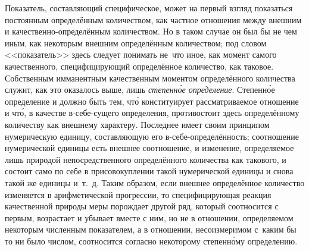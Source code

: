 Показатель, составляющий специфическое, может на первый взгляд показаться
постоянным определённым количеством, как частное отношения между внешним и
качественно-определённым количеством. Но в таком случае он был бы не чем иным,
как некоторым внешним определённым количеством; под словом <<показатель>> здесь
следует понимать не~что иное, как момент самого качественного, специфицирующий
определённое количество, как таковое. Собственным имманентным качественным
моментом определённого количества служит, как это оказалось выше, лишь
{\em степенн\'{о}е определение}. Степенн\'{о}е определение и должно быть тем,
чт\'{о} конституирует рассматриваемое отношение и чт\'{о}, в качестве
в-себе-сущего определения, противостоит здесь определённому количеству как
внешнему характеру. Последнее имеет своим принципом нумерическую единицу,
составляющую его в-себе-определённость; соотношение нумерической единицы есть
внешнее соотношение, и изменение, определяемое лишь природой непосредственного
определённого количества как такового, и состоит само по себе в присовокуплении
такой нумерической единицы и снова такой же единицы и~т.~д. Таким образом, если
внешнее определённое количество изменяется в арифметической прогрессии, то
специфицирующая реакция качественной природы меры порождает другой ряд, который
соотносится с первым, возрастает и убывает вместе с ним, но не в отношении,
определяемом некоторым численным показателем, а в отношении, несоизмеримом
с~каким бы то ни было числом, соотносится согласно некоторому степенн\'{о}му
определению.

\subsubsection[Примечание]{}

